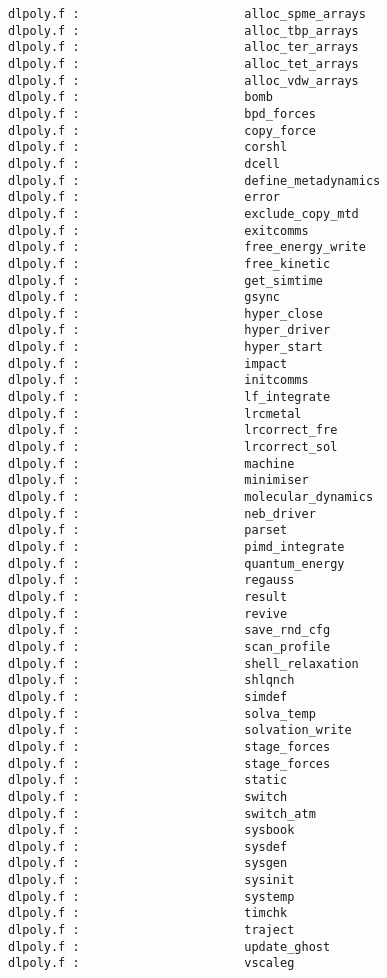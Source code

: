 \begin{verbatim}
dlpoly.f :                       alloc_spme_arrays 
dlpoly.f :                       alloc_tbp_arrays 
dlpoly.f :                       alloc_ter_arrays 
dlpoly.f :                       alloc_tet_arrays 
dlpoly.f :                       alloc_vdw_arrays 
dlpoly.f :                       bomb 
dlpoly.f :                       bpd_forces 
dlpoly.f :                       copy_force 
dlpoly.f :                       corshl 
dlpoly.f :                       dcell 
dlpoly.f :                       define_metadynamics 
dlpoly.f :                       error 
dlpoly.f :                       exclude_copy_mtd 
dlpoly.f :                       exitcomms 
dlpoly.f :                       free_energy_write 
dlpoly.f :                       free_kinetic 
dlpoly.f :                       get_simtime 
dlpoly.f :                       gsync 
dlpoly.f :                       hyper_close 
dlpoly.f :                       hyper_driver 
dlpoly.f :                       hyper_start 
dlpoly.f :                       impact 
dlpoly.f :                       initcomms 
dlpoly.f :                       lf_integrate 
dlpoly.f :                       lrcmetal 
dlpoly.f :                       lrcorrect_fre 
dlpoly.f :                       lrcorrect_sol 
dlpoly.f :                       machine 
dlpoly.f :                       minimiser 
dlpoly.f :                       molecular_dynamics 
dlpoly.f :                       neb_driver 
dlpoly.f :                       parset 
dlpoly.f :                       pimd_integrate 
dlpoly.f :                       quantum_energy 
dlpoly.f :                       regauss 
dlpoly.f :                       result 
dlpoly.f :                       revive 
dlpoly.f :                       save_rnd_cfg 
dlpoly.f :                       scan_profile 
dlpoly.f :                       shell_relaxation 
dlpoly.f :                       shlqnch 
dlpoly.f :                       simdef 
dlpoly.f :                       solva_temp 
dlpoly.f :                       solvation_write 
dlpoly.f :                       stage_forces 
dlpoly.f :                       stage_forces 
dlpoly.f :                       static 
dlpoly.f :                       switch 
dlpoly.f :                       switch_atm 
dlpoly.f :                       sysbook 
dlpoly.f :                       sysdef 
dlpoly.f :                       sysgen 
dlpoly.f :                       sysinit 
dlpoly.f :                       systemp 
dlpoly.f :                       timchk 
dlpoly.f :                       traject 
dlpoly.f :                       update_ghost 
dlpoly.f :                       vscaleg 

\end{verbatim}
